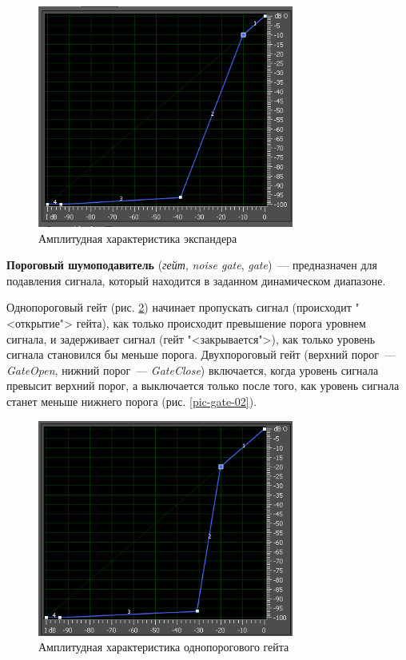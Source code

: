 \documentclass[oneside, final, 14pt]{extreport}
\begin{document}
\begin{figure}[h!]
  \centering
  \includegraphics[width=0.75\textwidth]{pic-exp-01}
  \caption{Амплитудная характеристика экспандера}
  \label{pic-exp-01}
\end{figure}

\textbf{Пороговый шумоподавитель} (\emph{гейт}, \emph{noise gate}, \emph{gate})~--- предназначен для подавления сигнала, который находится в заданном динамическом диапазоне.

Однопороговый гейт (рис. \ref{pic-gate-01}) начинает пропускать сигнал (происходит "<открытие"> гейта), как только происходит превышение порога уровнем сигнала, и задерживает сигнал (гейт "<закрывается">), как только уровень сигнала становился бы меньше порога. Двухпороговый гейт (верхний порог~--- \emph{GateOpen}, нижний порог~--- \emph{GateClose}) включается, когда уровень сигнала превысит верхний порог, а выключается только после того, как уровень сигнала станет меньше нижнего порога (рис. \ref{pic-gate-02}).

\begin{figure}[h!]
  \centering
  \includegraphics[width=0.75\textwidth]{pic-gate-01}
  \caption{Амплитудная характеристика однопорогового гейта}
  \label{pic-gate-01}
\end{figure}
\end{document}
